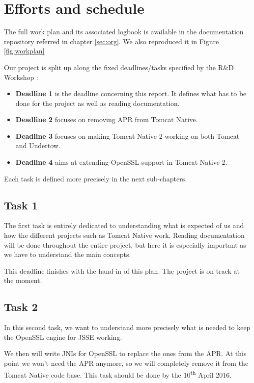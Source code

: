 \documentclass[11pt,a4paper,bibliography=totocnumbered]{scrartcl}
\def\mytitle{Tomcat Native 2}
\begin{document}
\section{Efforts and schedule}
The full work plan and its associated logbook is available in the documentation repository referred in chapter \ref{sec:org}. We also reproduced it in Figure \ref{fig:workplan}

Our project is split up along the fixed deadlines/tasks specified by the R\&D Workshop :
\begin{itemize}
\item \textbf{Deadline 1} is the deadline concerning this report. It defines what has to be done for the project as well as reading documentation.
\item \textbf{Deadline 2} focuses on removing APR from Tomcat Native. 
\item \textbf{Deadline 3} focuses on making \mytitle{} working on both Tomcat and Undertow.
\item \textbf{Deadline 4} aims at extending OpenSSL support in \mytitle{}.
\end{itemize}

Each task is defined more precisely in the next sub-chapters.

\subsection{Task 1}
\label{subsec:task1}
The first task is entirely dedicated to understanding what  is expected of us and how the different projects such as Tomcat Native work. Reading documentation will be done throughout the entire project, but here it is especially important as we have to understand the main concepts.

This deadline finishes with the hand-in of this plan. The project is on track at the moment.
\subsection{Task 2}
\label{subsec:task2}

In this second task, we want to understand more precisely what is needed to keep the OpenSSL engine for JSSE working.

We then will write JNIs for OpenSSL to replace the ones from the APR. At this point we won't need the APR anymore, so we will completely remove it from the Tomcat Native code base. This task should be done by the 10\textsuperscript{th} April 2016.
\end{document}
